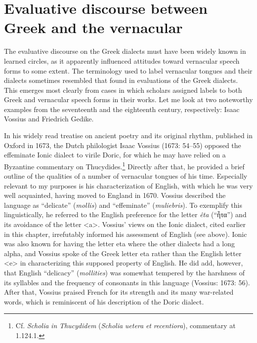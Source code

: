 \section{Evaluative discourse between Greek and the vernacular}

The evaluative discourse on the Greek dialects must have been widely known in learned circles, as it apparently influenced attitudes toward vernacular speech forms to some extent. The terminology used to label vernacular tongues and their dialects sometimes resembled that found in evaluations of the Greek dialects. This emerges most clearly from cases in which scholars assigned labels to both Greek and vernacular speech forms in their works. Let me look at two noteworthy examples from the seventeenth and the eighteenth century, respectively: Isaac Vossius and Friedrich Gedike.

In his widely read treatise on ancient poetry and its original rhythm, published in Oxford in 1673, the Dutch philologist Isaac Vossius (1673: 54–55) opposed the effeminate Ionic dialect to virile Doric, for which he may have relied on a Byzantine commentary on Thucydides.\footnote{Cf. \textit{Scholia} \textit{in} \textit{Thucydidem} (\textit{Scholia} \textit{uetera} \textit{et} \textit{recentiora}), commentary at 1.124.1.} Directly after that, he provided a brief outline of the qualities of a number of vernacular tongues of his time. Especially relevant to my purposes is his characterization of English, with which he was very well acquainted, having moved to England in 1670. Vossius described the language as “delicate” (\textit{mollis}) and “effeminate” (\textit{muliebris}). To exemplify this linguistically, he referred to the English preference for the letter \textit{êta} (“ἦτα”) and its avoidance of the letter <a>. Vossius’ views on the Ionic dialect, cited earlier in this chapter, irrefutably informed his assessment of English (see  above). Ionic was also known for having the letter eta where the other dialects had a long alpha, and Vossius spoke of the Greek letter eta rather than the English letter <e> in characterizing this supposed property of English. He did add, however, that English “delicacy” (\textit{mollities}) was somewhat tempered by the harshness of its syllables and the frequency of consonants in this language (Vossius: 1673: 56). After that, Vossius praised French for its strength and its many war-related words, which is reminiscent of his description of the Doric dialect.


